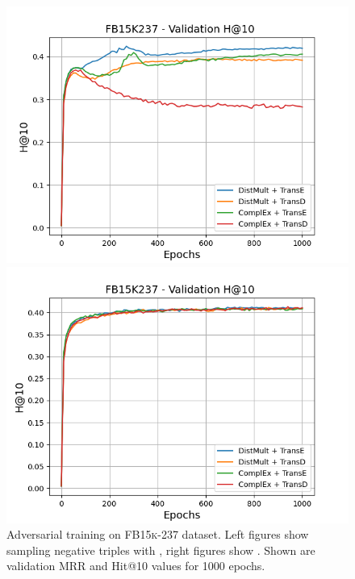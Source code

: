 \begin{figure}[H]
\begin{minipage}{.45\textwidth}
      \includegraphics[width=0.9\linewidth]{figures/results/gan_train/not_pretrained/uncertainty/max/entropy/fb15k237/1k_epochs/uncertainty_fb15k237_hit10.png}
    \end{minipage}%
    \begin{minipage}{.45\textwidth}
      \centering
      \includegraphics[width=0.9\linewidth]{figures/results/gan_train/not_pretrained/uncertainty/max_distribution/entropy/fb15k237/1k_epochs/uncertainty_fb15k237_hit10.png}
    \end{minipage}%
    \caption{Adversarial training on \textsc{FB15k-237} dataset. 
    Left figures show sampling negative triples with \usmax, right figures show \ussoftmax.
    Shown are validation MRR and Hit@10 values for 1000 epochs.}
    \label{fig:advtrain_fb15k237_usmax_ussoftmax}
\end{figure}



